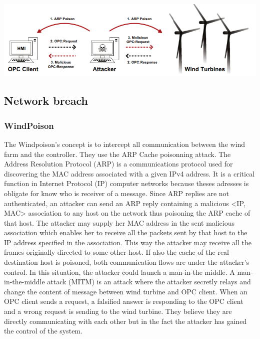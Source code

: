 \documentclass[twosided,a4,10pt]{article}
\begin{document}
\includegraphics{cache_poison}
\begin{multicols}{2}
\subsection{Network breach}

\subsubsection{WindPoison}
The Windpoison’s concept is to intercept all communication between the wind farm and the controller. They use the ARP Cache poisonning attack. The Address Resolution Protocol (ARP) is a communications protocol used for discovering the MAC address associated with a given IPv4 address. It is a critical function in Internet Protocol (IP) computer networks because theses adresses is obligate for know who is receiver of a message. \newline Since ARP replies are not authenticated, an attacker can send an ARP reply containing a malicious <IP, MAC> association to any host on the network thus poisoning the ARP cache of that host. The attacker may supply her MAC address in the sent malicious association which enables her to receive all the packets sent by that host to the IP address specified in the association. This way the attacker may receive all the frames originally directed to some other host. If also the cache of the real destination host is poisoned, both communication flows are under the attacker's control. \newline
In this situation, the attacker could launch a man-in-the middle. A man-in-the-middle attack (MITM) is an attack where the attacker secretly relays and change the content of message between wind turbine and OPC client. When an OPC client sends a request, a falsified answer is responding to the OPC client and a wrong request is sending to the wind turbine.  They believe they are directly communicating with each other but in the fact the attacker has gained the control of the system. 



\end{multicols}
\end{document}
